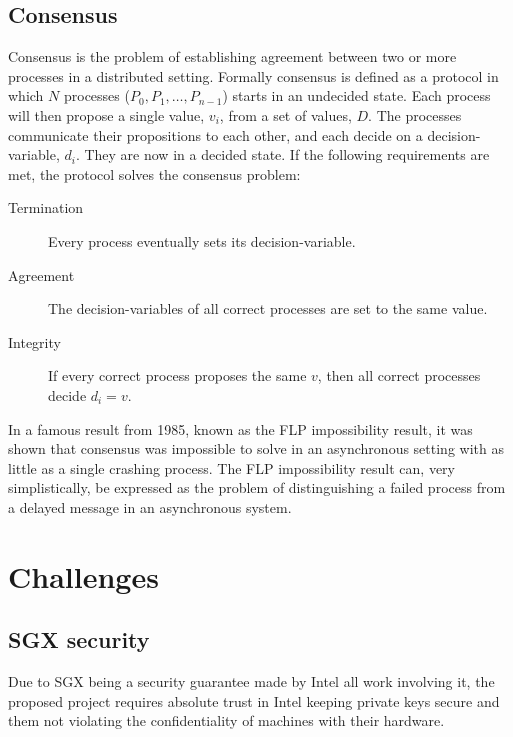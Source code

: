 \documentclass[12pt]{article}
\begin{document}
		\subsection{Consensus}
		Consensus is the problem of establishing agreement between two or more processes in a distributed setting. Formally consensus is defined as a protocol in which $N$ processes ($P_0, P_1, \dots, P_{n-1}$) starts in an undecided state. Each process will then propose a single value, $v_i$, from a set of values, $D$. The processes communicate their propositions to each other, and each decide on a decision-variable, $d_i$. They are now in a decided state. If the following requirements are met, the protocol solves the consensus problem:
		\begin{description}
			\item[Termination] Every process eventually sets its decision-variable. 
			\item[Agreement] The decision-variables of all correct processes are set to the same value.
			\item[Integrity] If every correct process proposes the same $v$, then all correct processes decide $d_i = v$.
		\end{description}

		In a famous result from 1985, known as the FLP impossibility result\cite{flp}, it was shown that consensus was impossible to solve in an asynchronous setting with as little as a single crashing process. The FLP impossibility result can, very simplistically, be expressed as the problem of distinguishing a failed process from a delayed message in an asynchronous system.\\

	\section{Challenges}

		\subsection{SGX security}

		Due to SGX being a security guarantee made by Intel all work involving it, the proposed project requires absolute trust in Intel keeping private keys secure and them not violating the confidentiality of machines with their hardware.
\end{document}
